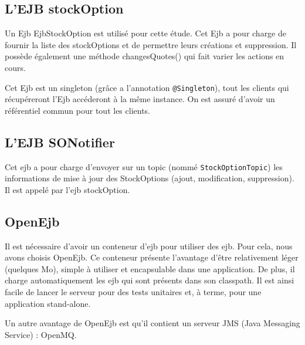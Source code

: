 \subsection{L'EJB stockOption}
Un Ejb EjbStockOption est utilisé pour cette étude. Cet Ejb a pour charge de fournir la liste des stockOptions et de permettre leurs créations et suppression. Il possède également une méthode changesQuotes() qui fait varier les actions en cours. 

Cet Ejb est un singleton (grâce a l'annotation \verb|@Singleton|), tout les clients qui récupéreront l'Ejb accéderont à la même instance. On est assuré d'avoir un référentiel commun pour tout les clients.

\subsection{L'EJB SONotifier}
Cet ejb a pour charge d'envoyer sur un topic (nommé \verb|StockOptionTopic|) les informations de mise à jour des StockOptions (ajout, modification, suppression). Il est appelé par l'ejb stockOption.

\subsection{OpenEjb}
Il est nécessaire d'avoir un conteneur d'ejb pour utiliser des ejb. Pour cela, nous avons choisis OpenEjb. Ce conteneur présente l'avantage d'être relativement léger (quelques Mo), simple à utiliser et encapsulable dans une application. De plus, il charge automatiquement les ejb qui sont présents dans son classpath. Il est ainsi facile de lancer le serveur pour des tests unitaires et, à terme, pour une application stand-alone. 

Un autre avantage de OpenEjb est qu'il contient un serveur JMS (Java Messaging Service) : OpenMQ.
